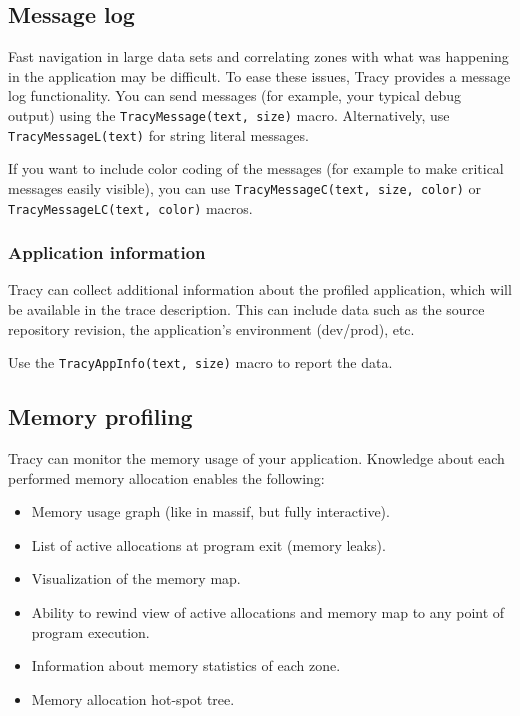\documentclass[hidelinks,titlepage,a4paper]{article}
\begin{document}
\subsection{Message log}
\label{messagelog}

Fast navigation in large data sets and correlating zones with what was happening in the application may be difficult. To ease these issues, Tracy provides a message log functionality. You can send messages (for example, your typical debug output) using the \texttt{TracyMessage(text, size)} macro. Alternatively, use \texttt{TracyMessageL(text)} for string literal messages.

If you want to include color coding of the messages (for example to make critical messages easily visible), you can use \texttt{TracyMessageC(text, size, color)} or \texttt{TracyMessageLC(text, color)} macros.

\subsubsection{Application information}
\label{appinfo}

Tracy can collect additional information about the profiled application, which will be available in the trace description. This can include data such as the source repository revision, the application's environment (dev/prod), etc.

Use the \texttt{TracyAppInfo(text, size)} macro to report the data.

\subsection{Memory profiling}
\label{memoryprofiling}

Tracy can monitor the memory usage of your application. Knowledge about each performed memory allocation enables the following:

\begin{itemize}
\item Memory usage graph (like in massif, but fully interactive).
\item List of active allocations at program exit (memory leaks).
\item Visualization of the memory map.
\item Ability to rewind view of active allocations and memory map to any point of program execution.
\item Information about memory statistics of each zone.
\item Memory allocation hot-spot tree.
\end{itemize}
\end{document}
